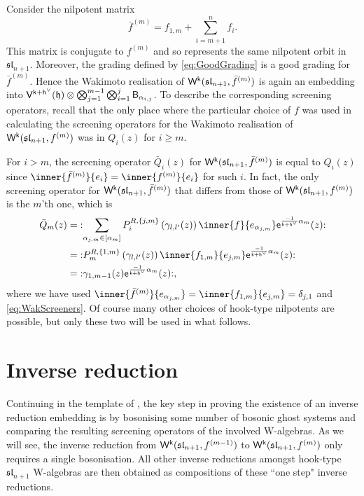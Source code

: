 \documentclass[10pt,a4paper]{amsart}
\numberwithin{equation}{section}
\newcommand{\ee}{\mathsf{e}}   %
\newcommand{\kk}{\mathsf{k}}   %
\DeclarePairedDelimiter{\brac}{\lparen}{\rparen}   %
\DeclarePairedDelimiter{\sqbrac}{\lbrack}{\rbrack} %
\DeclarePairedDelimiter{\set}{\lbrace}{\rbrace}
\newcommand{\no}[1]{\mathopen{:} #1 \mathclose{:}} %
\newcommand{\alg}[1]{\mathfrak{#1}}  %
\newcommand{\VOA}[1]{\mathsf{#1}}    %
\newcommand{\SLA}[2]{\alg{#1}_{#2}}                      %
\newcommand{\slnpone}{\SLA{sl}{n+1}}
\newcommand{\cartan}{\mathfrak{h}}
\newcommand{\cox}{\mathsf{h}}                                        %
\newcommand{\dcox}{\coroot{\cox}}                                    %
\newcommand{\sroot}[1]{\alpha_{#1}}                                  %
\newcommand{\prvec}[1]{e_{#1}}                                        %
\newcommand{\nrvec}[1]{f_{#1}}                                       %
\newcommand{\coroot}[1]{#1^{\vee}}                                   %
\newcommand{\fhook}[1]{f^{(#1)}}                                  %
\newcommand{\Wsymb}{\VOA{W}}
\newcommand{\uaffvoa}[2]{\VOA{V}^{#1}\brac{#2}}                   %
\newcommand{\bgvoa}{\VOA{B}}                                      %
\newcommand{\uQHR}[3]{\Wsymb^{#1}\brac{#2,#3}}                    %
\theoremstyle{plain}
\begin{document}
Consider the nilpotent matrix
%
\begin{equation}
    \bar{f}^{(m)} = \nrvec{1,m} + \sum_{i=m+1}^n \nrvec{i}.
\end{equation}
%
This matrix is conjugate to $\fhook{m}$ and so represents the same nilpotent orbit in $\slnpone$. Moreover, the grading defined by \eqref{eq:GoodGrading} is a good grading for $\bar{f}^{(m)}$. Hence the Wakimoto realisation of $\uQHR{\kk}{\slnpone}{\bar{f}^{(m)}}$ is again an embedding into $\uaffvoa{\kk+\dcox}{\cartan} \otimes \bigotimes_{j=1}^{m-1}\bigotimes_{i=1}^{j} \bgvoa_{\sroot{i,j}}$. To describe the corresponding screening operators, recall that the only place where the particular choice of $f$ was used in calculating the screening operators for the Wakimoto realisation of $\uQHR{\kk}{\slnpone}{\fhook{m}}$ was in $Q_i(z)$ for $i \geq m$. 

For $i > m$, the screening operator $\bar{Q}_i(z)$ for $\uQHR{\kk}{\slnpone}{\bar{f}^{(m)}}$ is equal to $Q_i(z)$ since $\inner{\bar{f}^{(m)}}{\prvec{i}}=\inner{\fhook{m}}{\prvec{i}}$ for such $i$. In fact, the only screening operator for $\uQHR{\kk}{\slnpone}{\bar{f}^{(m)}}$ that differs from those of $\uQHR{\kk}{\slnpone}{\fhook{m}}$ is the $m$'th one, which is
%
\begin{align}
    \bar{Q}_m(z) &= \no{\sum_{\alpha_{j,m} \in \sqbrac{\sroot{m}}} P^{R,\set{j,m}}_{i} \left(\gamma_{l,l'}(z)\right)  \inner{f}{e_{\alpha_{j,m}}} \ee^{\frac{-1}{\kk+\dcox} \alpha_{m}}(z)} \\
    &= \no{P^{R,\set{1,m}}_{m} \left(\gamma_{l,l'}(z)\right)  \inner{\nrvec{1,m}}{\prvec{j,m}} \ee^{\frac{-1}{\kk+\dcox} \alpha_{m}}(z)} \notag\\
    &= \no{\gamma_{1,m-1}(z) \ee^{\frac{-1}{\kk+\dcox} \alpha_{m}}(z)}, \notag
\end{align}
%
where we have used $\inner{\bar{f}^{(m)}}{e_{\alpha_{j,m}}} = \inner{\nrvec{1,m}}{\prvec{j,m}} = \delta_{j,1}$ and \eqref{eq:WakScreeners}. Of course many other choices of hook-type nilpotents are possible, but only these two will be used in what follows.


\section{Inverse reduction} \label{sec:Inverse}
Continuing in the template of \cite{Feh21c}, the key step in proving the existence of an inverse reduction embedding is by bosonising some number of bosonic ghost systems and comparing the resulting screening operators of the involved W-algebras. As we will see, the inverse reduction from $\uQHR{\kk}{\slnpone}{\fhook{m-1}}$ to $\uQHR{\kk}{\slnpone}{\fhook{m}}$ only requires a single bosonisation. All other inverse reductions amongst hook-type $\slnpone$ W-algebras are then obtained as compositions of these ``one step" inverse reductions.
\end{document}
